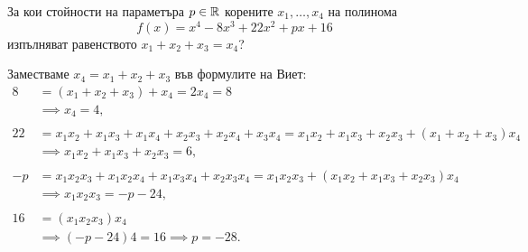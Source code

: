 \documentclass[numbers=endperiod, DIV=15, bibliography=totocnumbered]{scrartcl}
\begin{document}
\begin{exercise}
  За кои стойности на параметъра $p \in \mathbb{R}$ корените $x_1, \ldots, x_4$ на полинома
  \begin{displaymath}
    f(x) = x^4 - 8x^3 + 22x^2 + px + 16
  \end{displaymath}
  изпълняват равенството $x_1 + x_2 + x_3 = x_4$?
\end{exercise}
\begin{solution}
  Заместваме $x_4 = x_1 + x_2 + x_3$ във формулите на Виет:
  \begin{align*}
    8 &= (x_1 + x_2 + x_3) + x_4 = 2x_4 = 8
    \\&\implies
    x_4 = 4,
    \\ \\
    22 &= x_1 x_2 + x_1 x_3 + x_1 x_4 + x_2 x_3 + x_2 x_4 + x_3 x_4 = x_1 x_2 + x_1 x_3 + x_2 x_3 + (x_1 + x_2 + x_3) x_4
    \\&\implies
    x_1 x_2 + x_1 x_3 + x_2 x_3 = 6,
    \\ \\
    -p &= x_1 x_2 x_3 + x_1 x_2 x_4 + x_1 x_3 x_4 + x_2 x_3 x_4 = x_1 x_2 x_3 + (x_1 x_2 + x_1 x_3 + x_2 x_3) x_4 \\&\implies
    x_1 x_2 x_3 = -p - 24,
    \\ \\
    16 &= (x_1 x_2 x_3) x_4
    \\&\implies
    (-p - 24) 4 = 16 \implies p = -28.
  \end{align*}
\end{solution}

\printbibliography
\end{document}
